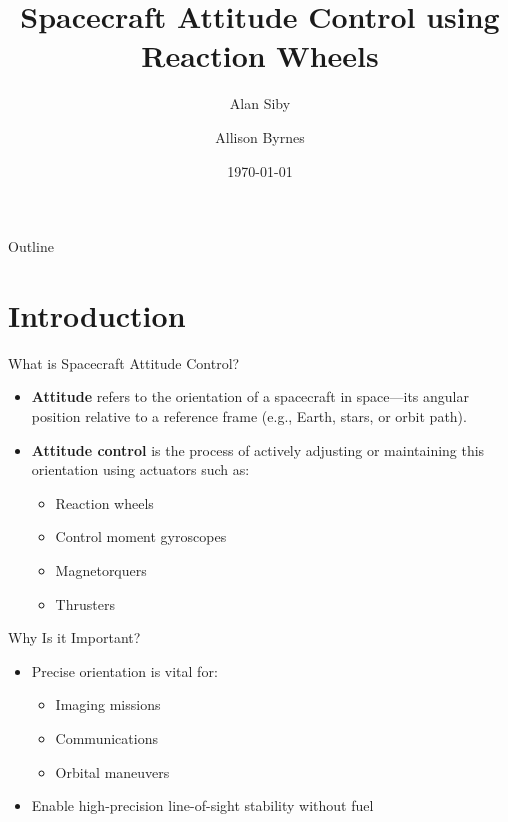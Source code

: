 \documentclass{beamer}
\title{Spacecraft Attitude Control using Reaction Wheels}
\author{Alan Siby \and Allison Byrnes}
\date{\today}
\begin{document}
\begin{frame}
  \titlepage
\end{frame}

\begin{frame}{Outline}
  \tableofcontents
\end{frame}

\section{Introduction}
\begin{frame}{What is Spacecraft Attitude Control?}
\begin{itemize}
  \item \textbf{Attitude} refers to the orientation of a spacecraft in space—its angular position relative to a reference frame (e.g., Earth, stars, or orbit path).
  
  \item \textbf{Attitude control} is the process of actively adjusting or maintaining this orientation using actuators such as:
  \begin{itemize}
    \item Reaction wheels
    \item Control moment gyroscopes
    \item Magnetorquers
    \item Thrusters
  \end{itemize}
\end{itemize}
\end{frame}

\begin{frame}{Why Is it Important?}
\begin{itemize}
  \item Precise orientation is vital for:
  \begin{itemize}
    \item Imaging missions
    \item Communications
    \item Orbital maneuvers
  \end{itemize}
  \item Enable high-precision line-of-sight stability without fuel
\end{itemize}
\end{frame}
\end{document}
